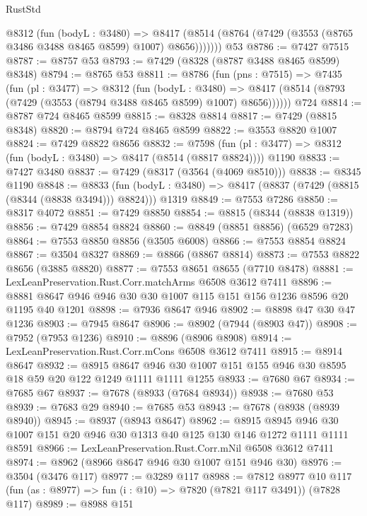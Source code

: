 \begin{lexlean}{RustStd}
\begin{coremodule}
        @8312
          (fun (bodyL : @3480) =>
          @8417 (@8514 (@8764 (@7429 (@3553 (@8765 @3486 @3488 @8465 @8599) @1007) @8656)))))))
    @53
@8786 := @7427 @7515
@8787 := @8757 @53
@8793 := @7429 (@8328 (@8787 @3488 @8465 @8599) @8348)
@8794 := @8765 @53
@8811 := @8786
    (fun (pns : @7515) =>
    @7435
      (fun (pl : @3477) =>
      @8312
        (fun (bodyL : @3480) =>
        @8417 (@8514 (@8793 (@7429 (@3553 (@8794 @3488 @8465 @8599) @1007) @8656))))))
    @724
@8814 := @8787 @724 @8465 @8599
@8815 := @8328 @8814
@8817 := @7429 (@8815 @8348)
@8820 := @8794 @724 @8465 @8599
@8822 := @3553 @8820 @1007
@8824 := @7429 @8822 @8656
@8832 := @7598
    (fun (pl : @3477) => @8312 (fun (bodyL : @3480) => @8417 (@8514 (@8817 @8824))))
    @1190
@8833 := @7427 @3480
@8837 := @7429 (@8317 (@3564 (@4069 @8510)))
@8838 := @8345 @1190
@8848 := @8833
    (fun (bodyL : @3480) => @8417 (@8837 (@7429 (@8815 (@8344 (@8838 @3494))) @8824)))
    @1319
@8849 := @7553 @7286
@8850 := @8317 @4072
@8851 := @7429 @8850
@8854 := @8815 (@8344 (@8838 @1319))
@8856 := @7429 @8854 @8824
@8860 := @8849 (@8851 @8856) (@6529 @7283)
@8864 := @7553 @8850 @8856 (@3505 @6008)
@8866 := @7553 @8854 @8824
@8867 := @3504 @8327
@8869 := @8866 (@8867 @8814)
@8873 := @7553 @8822 @8656 (@3885 @8820)
@8877 := @7553 @8651 @8655 (@7710 @8478)
@8881 := LexLeanPreservation.Rust.Corr.matchArms @6508 @3612 @7411
@8896 := @8881 @8647 @946 @946 @30 @30 @1007 @115 @151 @156 @1236 @8596 @20 @1195 @40 @1201
@8898 := @7936 @8647 @946
@8902 := @8898 @47 @30 @47 @1236
@8903 := @7945 @8647
@8906 := @8902 (@7944 (@8903 @47))
@8908 := @7952 (@7953 @1236)
@8910 := @8896 (@8906 @8908)
@8914 := LexLeanPreservation.Rust.Corr.mCons @6508 @3612 @7411
@8915 := @8914 @8647
@8932 := @8915
    @8647
    @946
    @30
    @1007
    @151
    @155
    @946
    @30
    @8595
    @18
    @59
    @20
    @122
    @1249
    @1111
    @1111
    @1255
@8933 := @7680 @67
@8934 := @7685 @67
@8937 := @7678 (@8933 (@7684 @8934))
@8938 := @7680 @53
@8939 := @7683 @29
@8940 := @7685 @53
@8943 := @7678 (@8938 (@8939 @8940))
@8945 := @8937 (@8943 @8647)
@8962 := @8915
    @8945
    @946
    @30
    @1007
    @151
    @20
    @946
    @30
    @1313
    @40
    @125
    @130
    @146
    @1272
    @1111
    @1111
    @8591
@8966 := LexLeanPreservation.Rust.Corr.mNil @6508 @3612 @7411
@8974 := @8962 (@8966 @8647 @946 @30 @1007 @151 @946 @30)
@8976 := @3504 (@3476 @117)
@8977 := @3289 @117
@8988 := @7812
    @8977
    @10
    @117
    (fun (as : @8977) => fun (i : @10) => @7820 (@7821 @117 @3491))
    (@7828 @117)
@8989 := @8988 @151

\end{coremodule}
\end{lexlean}
